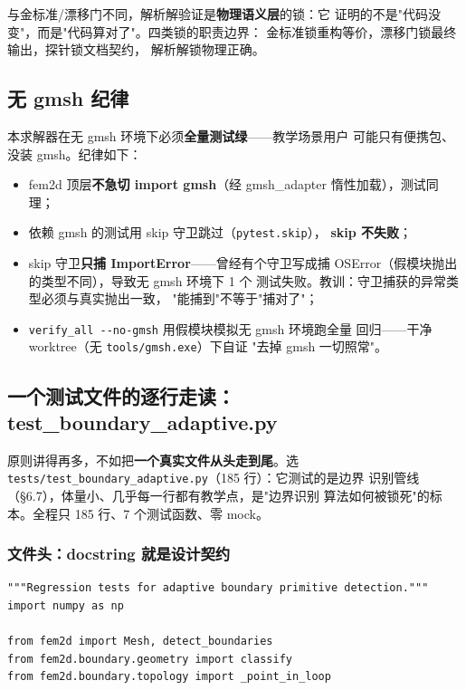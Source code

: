 \documentclass[12pt,a4paper]{ctexart}
\newcommand{\fem}{\Verb}
\begin{document}
与金标准/漂移门不同，解析解验证是\textbf{物理语义层}的锁：它
证明的不是"代码没变"，而是"代码算对了"。四类锁的职责边界：
金标准锁重构等价，漂移门锁最终输出，探针锁文档契约，
解析解锁物理正确。

\subsection{无 gmsh 纪律}

本求解器在无 gmsh 环境下必须\textbf{全量测试绿}——教学场景用户
可能只有便携包、没装 gmsh。纪律如下：

\begin{itemize}[leftmargin=*]
  \item fem2d 顶层\textbf{不急切 import gmsh}（经
        gmsh\_adapter 惰性加载），测试同理；
  \item 依赖 gmsh 的测试用 skip 守卫跳过（\fem|pytest.skip|），
        \textbf{skip 不失败}；
  \item skip 守卫\textbf{只捕 ImportError}——曾经有个守卫写成捕
        OSError（假模块抛出的类型不同），导致无 gmsh 环境下 1 个
        测试失败。教训：守卫捕获的异常类型必须与真实抛出一致，
        "能捕到"不等于"捕对了"；
  \item \fem|verify_all --no-gmsh| 用假模块模拟无 gmsh 环境跑全量
        回归——干净 worktree（无 \fem|tools/gmsh.exe|）下自证
        "去掉 gmsh 一切照常"。
\end{itemize}

\subsection{一个测试文件的逐行走读：test\_boundary\_adaptive.py}

原则讲得再多，不如把\textbf{一个真实文件从头走到尾}。选
\newline \fem|tests/test_boundary_adaptive.py|（185 行）：它测试的是边界
识别管线（§6.7），体量小、几乎每一行都有教学点，是"边界识别
算法如何被锁死"的标本。全程只 185 行、7 个测试函数、零 mock。

\subsubsection{文件头：docstring 就是设计契约}

\begin{lstlisting}
"""Regression tests for adaptive boundary primitive detection."""
import numpy as np

from fem2d import Mesh, detect_boundaries
from fem2d.boundary.geometry import classify
from fem2d.boundary.topology import _point_in_loop
\end{lstlisting}
\end{document}
